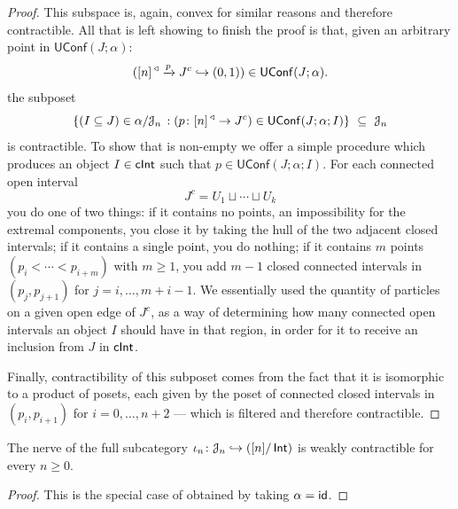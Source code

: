 \begin{proof}
                \nid This subspace is, again, convex for similar reasons and therefore contractible. All that is left showing to finish the proof is that, given an arbitrary point in $\mathsf{UConf}(J;\alpha)$: 
                \[([n]^{\, \operatorname{\triangleleft}} \xrightarrow{p} J^{c} \hookrightarrow (0,1)) \in \mathsf{UConf}(J;\alpha).\] 
                the subposet 
                \begin{equation}
                     \left\{(I\subseteq J) \in \alpha/\mathcal J_n \, : (p \colon [n]^{\, \operatorname{\triangleleft}} \rightarrow J^{c}) \in \mathsf{UConf}(J;\alpha; I) \right\} \,\, \subseteq \,\, \mathcal J_{n} 
                \end{equation}
                is contractible. To show that is non-empty we offer a simple procedure which produces an object $I\in \operatorname{\mathsf{cInt}}$ such that $p\in \mathsf{UConf}(J;\alpha;I)$. For each connected open interval \begin{equation} 
                    J^{c} = U_1 \sqcup \cdots \sqcup U_{k} 
                \end{equation} 
                you do one of two things: if it contains no points, an impossibility for the extremal components, you close it by taking the hull of the two adjacent closed intervals; if it contains a single point, you do nothing; if it contains $m$ points $(p_i < \cdots < p_{i+m})$ with $m\geq 1$, you add $m-1$ closed connected intervals in $(p_{j},p_{j+1})$ for $j=i,\ldots,m+i-1$. We essentially used the quantity of particles on a given open edge of $J^c$, as a way of determining how many connected open intervals an object $I$ should have in that region, in order for it to receive an inclusion from $J$ in $\operatorname{\mathsf{cInt}}$. 
                
                Finally, contractibility of this subposet comes from the fact that it is isomorphic to a product of posets, each given by the poset of connected closed intervals in $(p_i, p_{i+1})$ for $i=0,\ldots, n+2$ — which is filtered and therefore contractible. \end{proof}

\begin{proposition}\label{ch2:: prop: weak contractibility of pi_0}
    The nerve of the full subcategory $\iota_n \colon \mathcal J_n \hookrightarrow ([n]/\operatorname{\mathsf{Int}})$ is weakly contractible for every $n\geq 0$.
\end{proposition}

\begin{proof}
   This is the special case of  obtained by taking $\alpha = \operatorname{\sf id}$.
\end{proof}

